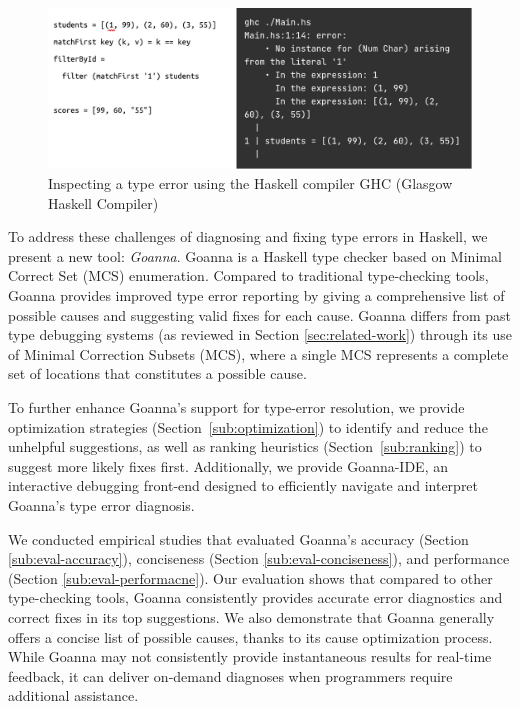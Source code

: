     \begin{figure}[ht!]
        \centering
        \includegraphics[width=\linewidth]{images/motivation}
        \caption{Inspecting a type error using the Haskell compiler GHC (Glasgow Haskell Compiler)}
        \label{fig:motivation}
    \end{figure}




    To address these challenges of diagnosing and fixing type errors in Haskell, we present a new tool: \textit{Goanna}. Goanna is a Haskell type checker based on Minimal Correct Set (MCS) enumeration. Compared to traditional type-checking tools, Goanna provides improved type error reporting by giving a comprehensive list of possible causes and suggesting valid fixes for each cause.  Goanna differs from past type debugging systems (as reviewed in Section \ref{sec:related-work}) through its use of Minimal Correction Subsets (MCS), where a single MCS represents a complete set of locations that constitutes a possible cause.

	To further enhance Goanna's support for type-error resolution, we provide optimization strategies (Section~\ref{sub:optimization}) to identify and reduce the unhelpful suggestions, as well as ranking heuristics (Section~\ref{sub:ranking}) to suggest more likely fixes first. Additionally, we provide Goanna-IDE, an interactive debugging front-end designed to efficiently navigate and interpret Goanna's type error diagnosis.

    We conducted empirical studies that evaluated Goanna's accuracy (Section \ref{sub:eval-accuracy}), conciseness (Section \ref{sub:eval-conciseness}), and performance (Section \ref{sub:eval-performacne}). Our evaluation shows that compared to other type-checking tools, Goanna consistently provides accurate error diagnostics and correct fixes in its top suggestions. We also demonstrate that Goanna generally offers a concise list of possible causes, thanks to its cause optimization process. While Goanna may not consistently provide instantaneous results for real-time feedback, it can deliver on-demand diagnoses when programmers require additional assistance.
    

